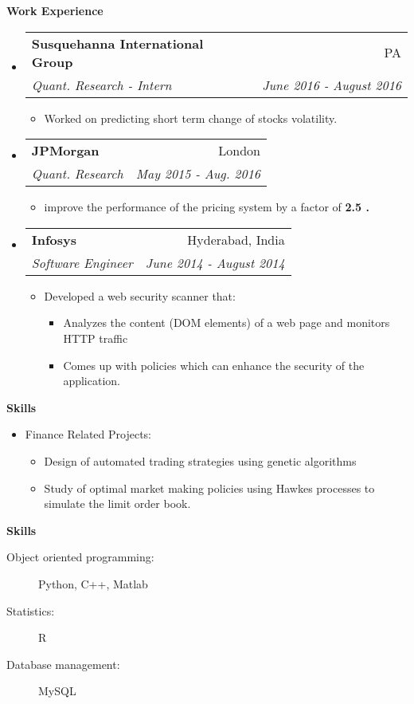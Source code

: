 \documentclass[letterpaper,11pt]{article}
\makeatletter
\newcommand{\resitem}[1]{\item #1 \vspace{-2pt}}
\newcommand{\resheading}[1]{\begin{mdframed}[backgroundcolor=blue!20] \bf{#1}  \end{mdframed}}
\newcommand{\ressubheading}[4]{
  \begin{tabular*}{6.5in}{l@{\extracolsep{\fill}}r}
    \textbf{#1} & #2 \\
    \textit{#3} & \textit{#4} \\
  \end{tabular*}\vspace{-6pt}}
\makeatother
\begin{document}
\resheading{Work Experience}
\begin{itemize}
\item
  \ressubheading{Susquehanna International Group}{PA}{Quant. Research  - Intern}{June 2016 - August 2016}
  \begin{itemize}
    \resitem{Worked on predicting short term change of stocks volatility.}
  \end{itemize}

\item 
  \ressubheading{JPMorgan}{London}{Quant. Research}{May 2015 - Aug. 2016}
  \begin{itemize}
    \resitem{improve the performance of the pricing system by a factor of \bf{2.5}}.
  \end{itemize}

\item
  \ressubheading{Infosys}{Hyderabad, India}{Software Engineer}{June 2014 - August 2014}
  \begin{itemize}
    \resitem{Developed a web security scanner that:
      \begin{itemize}
      \item Analyzes the content (DOM elements) of a web page and monitors HTTP traffic
      \item Comes up with policies which can enhance the security of the application.
      \end{itemize}
    }
  \end{itemize}
\end{itemize}

\resheading{Skills}
\begin{itemize}
  \item Finance Related Projects:
  \begin{itemize}
    \item Design of automated trading strategies using genetic algorithms
    \item Study of optimal market making policies using Hawkes processes to simulate the limit order book.
  \end{itemize}
\end{itemize}

\resheading{Skills}

\begin{description}
\item[Object oriented programming:] Python, C++, Matlab 
\item[Statistics:] R
\item[Database management:] MySQL 
\end{description}
\end{document}
